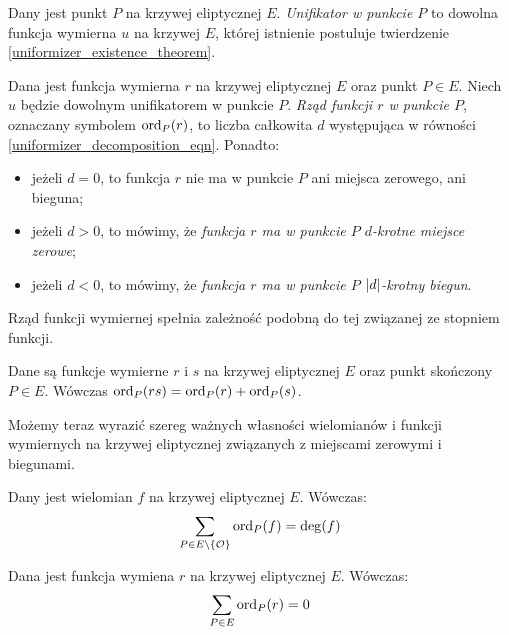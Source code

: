 \begin{definition}
Dany jest punkt $P$ na krzywej eliptycznej $E$.
\emph{Unifikator w punkcie $P$}
to dowolna funkcja wymierna $u$ na krzywej $E$,
której istnienie postuluje twierdzenie \ref{uniformizer_existence_theorem}.
\end{definition}

\begin{definition}
Dana jest funkcja wymierna $r$ na krzywej eliptycznej $E$
oraz punkt $P \in E$.
Niech $u$ będzie dowolnym unifikatorem w punkcie $P$.
\emph{Rząd funkcji $r$ w punkcie $P$},
oznaczany symbolem $\operatorname{ord}_P(r)$,
to liczba całkowita $d$
występująca w równości \ref{uniformizer_decomposition_eqn}.
Ponadto:
\begin{itemize}
\item jeżeli $d = 0$,
to funkcja $r$ nie ma w punkcie $P$ ani miejsca zerowego, ani bieguna;
\item jeżeli $d > 0$, to mówimy,
że \emph{funkcja $r$ ma w punkcie $P$ $d$-krotne miejsce zerowe};
\item jeżeli $d < 0$, to mówimy,
że \emph{funkcja $r$ ma w punkcie $P$ $\lvert d\rvert$-krotny biegun}.
\end{itemize}
\end{definition}

Rząd funkcji wymiernej spełnia zależność
podobną do tej związanej ze stopniem funkcji.

\begin{theorem}
Dane są funkcje wymierne $r$ i $s$ na krzywej eliptycznej $E$
oraz punkt skończony $P \in E$.
Wówczas $\operatorname{ord}_P(rs) = \operatorname{ord}_P(r) + \operatorname{ord}_P(s)$.
\end{theorem}

Możemy teraz wyrazić szereg ważnych własności
wielomianów i funkcji wymiernych na krzywej eliptycznej
związanych z miejscami zerowymi i biegunami.

\begin{theorem}\label{polynomial_ord_deg_theorem}
Dany jest wielomian $f$ na krzywej eliptycznej $E$.
Wówczas:
\begin{equation*}
\sum_{P \in E\setminus \{\mathcal{O}\}} \operatorname{ord}_P(f) = \deg(f)
\end{equation*}
\end{theorem}

\begin{corollary}\label{function_order_sum_zero_corollary}
Dana jest funkcja wymiena $r$ na krzywej eliptycznej $E$.
Wówczas:
\begin{equation*}
\sum_{P \in E} \operatorname{ord}_P(r) = 0
\end{equation*}
\end{corollary}

